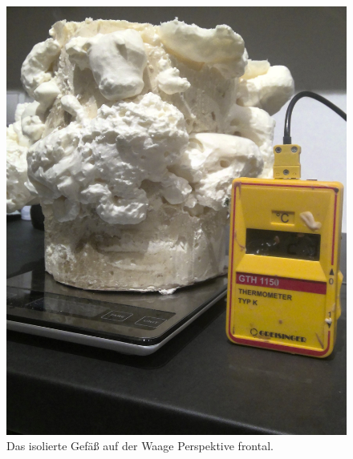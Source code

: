 \documentclass[11pt, ngerman]{scrartcl}
\begin{document}
\begin{figure}[H]
\begin{minipage}[t]{.33\linewidth}
            \includegraphics[width=\linewidth]{pics/Aufbau (2).jpg}
            \caption[Aufbau isoliertes Gefäß auf der Waage (Frontal)]{Das isolierte Gefäß
            auf der Waage Perspektive frontal.}
            \label{fig:waageaufbau2}
        \end{minipage}
        \begin{minipage}[t]{.30\linewidth} %

\end{minipage}
\end{figure}
\end{document}
